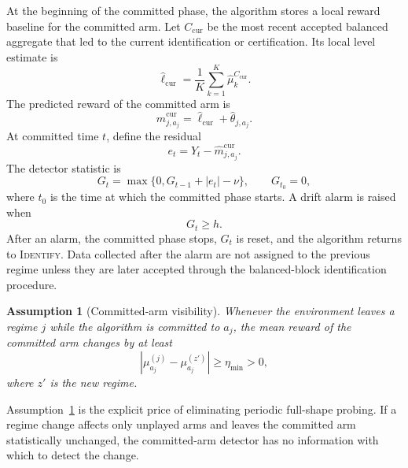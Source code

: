 \documentclass[11pt]{article}
\newtheorem{assumption}{Assumption}
\newcommand{\ID}{\textsc{Identify}}
\begin{document}
At the beginning of the committed phase, the algorithm stores a local reward baseline for the committed arm. Let $C_{\mathrm{cur}}$ be the most recent accepted balanced aggregate that led to the current identification or certification. Its local level estimate is
\begin{equation}
    \widehat\ell_{\mathrm{cur}}
    =
    \frac{1}{K}\sum_{k=1}^K\widehat\mu^{C_{\mathrm{cur}}}_k.
\end{equation}
The predicted reward of the committed arm is
\begin{equation}
    \widehat m_{j,a_j}^{\mathrm{cur}}
    =
    \widehat\ell_{\mathrm{cur}}+\widehat\theta_{j,a_j}.
    \label{eq:local-baseline}
\end{equation}
At committed time $t$, define the residual
\begin{equation}
    e_t=Y_t-\widehat m_{j,a_j}^{\mathrm{cur}}.
\end{equation}
The detector statistic is
\begin{equation}
    G_t=\max\{0,G_{t-1}+|e_t|-\nu\},
    \qquad G_{t_0}=0,
    \label{eq:cusum}
\end{equation}
where $t_0$ is the time at which the committed phase starts. A drift alarm is raised when
\begin{equation}
    G_t\geq h.
    \label{eq:alarm}
\end{equation}
After an alarm, the committed phase stops, $G_t$ is reset, and the algorithm returns to \ID. Data collected after the alarm are not assigned to the previous regime unless they are later accepted through the balanced-block identification procedure.

\begin{assumption}[Committed-arm visibility]
\label{ass:visibility}
Whenever the environment leaves a regime $j$ while the algorithm is committed to $a_j$, the mean reward of the committed arm changes by at least
\begin{equation}
    \left|\mu_{a_j}^{(j)}-\mu_{a_j}^{(z')}\right|
    \geq
    \eta_{\min}>0,
    \label{eq:visibility}
\end{equation}
where $z'$ is the new regime.
\end{assumption}

Assumption~\ref{ass:visibility} is the explicit price of eliminating periodic full-shape probing. If a regime change affects only unplayed arms and leaves the committed arm statistically unchanged, the committed-arm detector has no information with which to detect the change.
\end{document}
